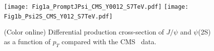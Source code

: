 \documentclass[aps,prc,preprint,superscriptaddress,showpacs,showkeys,amsmath]{revtex4-1}
\begin{document}


\begin{figure}
\texttt{[image: Fig1a\_PromptJPsi\_CMS\_Y0012\_S7TeV.pdf]}
\texttt{[image: Fig1b\_Psi2S\_CMS\_Y012\_S7TeV.pdf]}
\caption{(Color online) Differential production cross-section of $J/\psi$ and $\psi$(2S) as a function of $p_{T}$ compared 
  with the CMS~\cite{Chatrchyan:2011kc,Khachatryan:2015rra} data.}
\label{Fig:SigmaPsi}
\end{figure}
\end{document}
